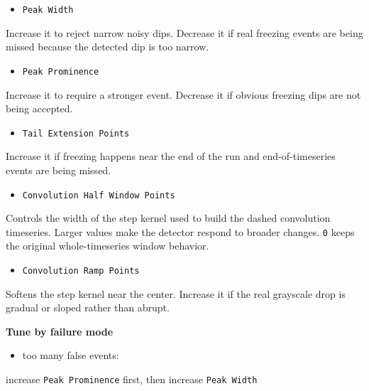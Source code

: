 \documentclass[
  9pt,
  letterpaper,
  oneside,
  open=any,
  DIV=15,
  parskip=half-,
  headings=big,
  numbers=noenddot
]{scrbook}
\newcommand{\manuallead}[1]{%
  \vspace{0.15em}%
  {\sffamily\bfseries\color{ManualBlue}#1}\par\nobreak\vspace{0.05em}%
}
\begin{document}
\begin{itemize}[leftmargin=*,itemsep=0.35em,topsep=0.4em]
\item \texttt{Peak Width}
\end{itemize}

Increase it to reject narrow noisy dips. Decrease it if real freezing events are being missed because the detected dip is too narrow.


\begin{itemize}[leftmargin=*,itemsep=0.35em,topsep=0.4em]
\item \texttt{Peak Prominence}
\end{itemize}

Increase it to require a stronger event. Decrease it if obvious freezing dips are not being accepted.


\begin{itemize}[leftmargin=*,itemsep=0.35em,topsep=0.4em]
\item \texttt{Tail Extension Points}
\end{itemize}

Increase it if freezing happens near the end of the run and end-of-timeseries events are being missed.


\begin{itemize}[leftmargin=*,itemsep=0.35em,topsep=0.4em]
\item \texttt{Convolution Half Window Points}
\end{itemize}

Controls the width of the step kernel used to build the dashed convolution timeseries. Larger values make the detector respond to broader changes. \texttt{0} keeps the original whole-timeseries window behavior.


\begin{itemize}[leftmargin=*,itemsep=0.35em,topsep=0.4em]
\item \texttt{Convolution Ramp Points}
\end{itemize}

Softens the step kernel near the center. Increase it if the real grayscale drop is gradual or sloped rather than abrupt.


\manuallead{Tune by failure mode}

\begin{itemize}[leftmargin=*,itemsep=0.35em,topsep=0.4em]
\item too many false events:
\end{itemize}

increase \texttt{Peak Prominence} first, then increase \texttt{Peak Width}
\end{document}
